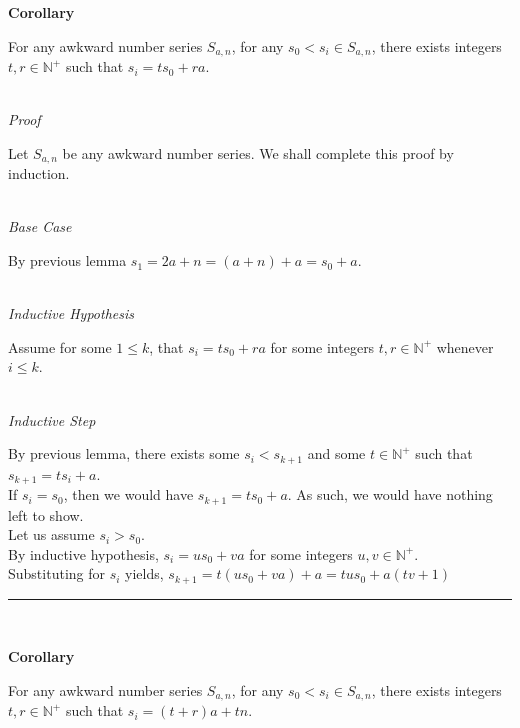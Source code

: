 \documentclass[a4paper,12pt]{article}
\begin{document}
\label{corollary:relation_to_initial}
\hypertarget{corollary:relation_to_initial}{}
\begin{tcolorbox}
\textbf{Corollary}

For any awkward number series $S_{a,n}$, for any $s_0 < s_i \in S_{a,n}$, there exists integers $t, r \in \mathbb{N}^+$ such that $s_i = ts_0 + ra$.

\end{tcolorbox}


\noindent \\
\textit{Proof}

\noindent Let $S_{a, n}$ be any awkward number series. We shall complete this proof by induction.


\noindent \\
\textit{Base Case}

\noindent By previous lemma $s_1 = 2a + n = (a + n) + a = s_0 + a$.


\noindent \\
\textit{Inductive Hypothesis}

\noindent Assume for some $1 \leq k$, that $s_i = ts_0 + ra$ for some integers $t, r \in \mathbb{N}^+$ whenever $i \leq k$.


\noindent  \\
\textit{Inductive Step}

\noindent By previous lemma, there exists some $s_i < s_{k+1}$ and some $t \in \mathbb{N}^+$ such that $s_{k+1} = ts_i + a$.\\


\noindent If $s_i = s_0$, then we would have $s_{k+1} = ts_0 + a$. As such, we would have nothing left to show.\\

\noindent Let us assume $s_i > s_0$.\\

\noindent By inductive hypothesis, $s_i = us_0 + va$ for some integers $u, v \in \mathbb{N}^+$.\\

\noindent Substituting for $s_i$ yields, $s_{k + 1} = t(us_0 + va) + a = tus_0 + a(tv + 1)$


\begin{center}
\noindent\rule{8cm}{0.4pt}
\end{center}
\noindent \\








\label{corollary:relation_to_initial_p2}
\hypertarget{corollary:relation_to_initial_p2}{}
\begin{tcolorbox}
\textbf{Corollary}

For any awkward number series $S_{a,n}$, for any $s_0 < s_i \in S_{a,n}$, there exists integers $t, r \in \mathbb{N}^+$ such that $s_i = (t + r)a + tn$.

\end{tcolorbox}
\end{document}
